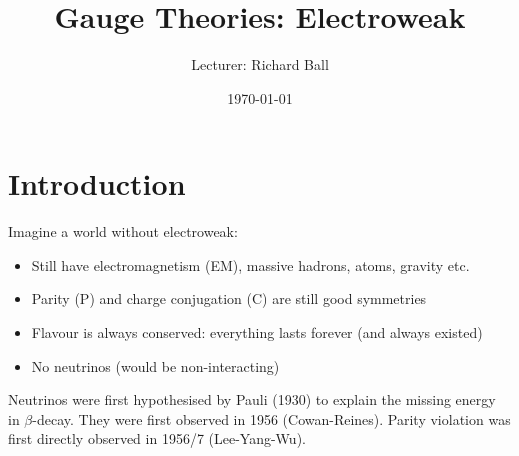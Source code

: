 \documentclass[a4paper,12pt]{article}
\title{\textbf{Gauge Theories: Electroweak}}
\author{Lecturer: Richard Ball}
\date{\normalsize\today} %
\begin{document}
\maketitle
\section{Introduction}
%
Imagine a world without electroweak:
\begin{itemize}
    \item Still have electromagnetism (EM), massive hadrons, atoms, gravity etc.
    \item Parity (P) and charge conjugation (C) are still good symmetries
    \item Flavour is always conserved: everything lasts forever (and always existed)
    \item No neutrinos (would be non-interacting)
\end{itemize}
%
Neutrinos were first hypothesised by Pauli (1930) to explain the missing energy in $\beta$-decay. They were first observed in 1956 (Cowan-Reines). Parity violation was first directly observed in 1956/7 (Lee-Yang-Wu).
\end{document}
